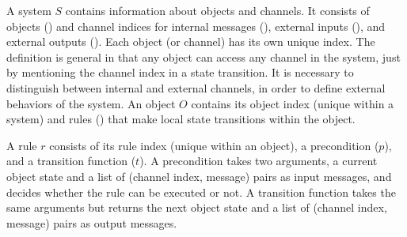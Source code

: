 A system $S$ contains information about objects and channels.
It consists of objects () and channel indices for internal messages (), external inputs (), and external outputs ().
Each object (or channel) has its own unique index.
The definition is general in that any object can access any channel in the system, just by mentioning the channel index in a state transition.
It is necessary to distinguish between internal and external channels, in order to define external behaviors of the system.
An object $O$ contains its object index (unique within a system) and rules () that make local state transitions within the object.

A rule $r$ consists of its rule index (unique within an object), a precondition ($p$), and a transition function ($t$).
A precondition takes two arguments, a current object state and a list of (channel index, message) pairs as input messages, and decides whether the rule can be executed or not.
A transition function takes the same arguments but returns the next object state and a list of (channel index, message) pairs as output messages.

